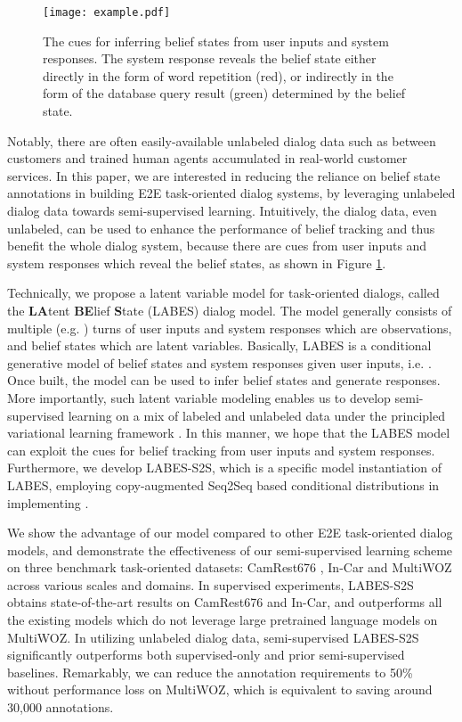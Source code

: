 \documentclass[11pt,a4paper]{article}
\newcommand{\modelname}{LABES}
\begin{document}
	\begin{figure}[t]
		\centering
		\texttt{[image: example.pdf]}
\caption{The cues for inferring belief states from user inputs and system responses. The system response reveals the belief state either directly in the form of word repetition (red), or indirectly in the form of the database query result (green) determined by the belief state. }
		\label{dial_example}
\end{figure}
	
Notably, there are often easily-available unlabeled dialog data such as between customers and trained human agents accumulated in real-world customer services.
	In this paper, we are interested in reducing the reliance on belief state annotations in building E2E task-oriented dialog systems, by leveraging unlabeled dialog data towards semi-supervised learning.
	Intuitively, the dialog data, even unlabeled, can be used to enhance the performance of belief tracking and thus benefit the whole dialog system, because there are cues from user inputs and system responses which reveal the belief states, as shown in Figure \ref{dial_example}.
	


Technically, we propose a latent variable model for task-oriented dialogs, called the \textbf{LA}tent \textbf{BE}lief \textbf{S}tate (\modelname{}) dialog model.
	The model generally consists of multiple (e.g. ) turns of user inputs  and system responses  which are observations, and belief states  which are latent variables.
	Basically, \modelname{} is a conditional generative model of belief states and system responses given user inputs, i.e. .
	Once built, the model can be used to infer belief states and generate responses.
	More importantly, such latent variable modeling enables us to develop semi-supervised learning on a mix of labeled and unlabeled data under the principled variational learning framework \cite{kingma2013auto,sohn2015learning}.
	In this manner, we hope that the LABES model can exploit the cues for belief tracking from user inputs and system responses.
	Furthermore, we develop \modelname{}-S2S, which is a specific model instantiation of \modelname{}, employing copy-augmented Seq2Seq \cite{gu2016incorporating} based conditional distributions in implementing . 
	




	We show the advantage of our model compared to other E2E task-oriented dialog models, and demonstrate the effectiveness of our semi-supervised learning scheme on three benchmark task-oriented datasets: CamRest676 \cite{wen2017a}, In-Car \cite{eric2017key} and MultiWOZ \cite{budzianowski2018multiwoz} across various scales and domains. 
	In supervised experiments, \modelname{}-S2S obtains state-of-the-art results on CamRest676 and In-Car, and outperforms all the existing models which do not leverage large pretrained language models on MultiWOZ. 
	In utilizing unlabeled dialog data, semi-supervised \modelname{}-S2S significantly outperforms both supervised-only and prior semi-supervised baselines. 
	Remarkably, we can reduce the annotation requirements to 50\% without performance loss on MultiWOZ, which is equivalent to saving around 30,000 annotations. 
	
\end{document}
